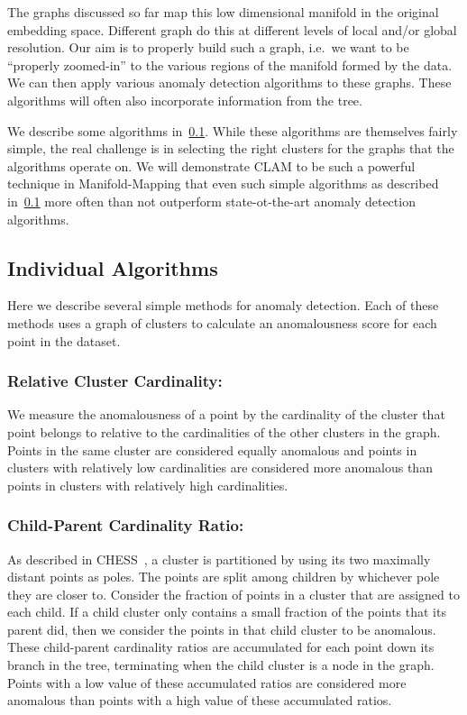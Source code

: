 The graphs discussed so far map this low dimensional manifold in the original embedding space.
Different graph do this at different levels of local and/or global resolution.
Our aim is to properly build such a graph, i.e.\ we want to be ``properly zoomed-in'' to the various regions of the manifold formed by the data.
We can then apply various anomaly detection algorithms to these graphs.
These algorithms will often also incorporate information from the tree.

We describe some algorithms in~\ref{subsec:chaoda:individual-algorithms}.
While these algorithms are themselves fairly simple, the real challenge is in selecting the right clusters for the graphs that the algorithms operate on.
We will demonstrate CLAM to be such a powerful technique in Manifold-Mapping that even such simple algorithms as described in~\ref{subsec:chaoda:individual-algorithms} more often than not outperform state-ot-the-art anomaly detection algorithms.

\subsection{Individual Algorithms}
\label{subsec:chaoda:individual-algorithms}

Here we describe several simple methods for anomaly detection.
Each of these methods uses a graph of clusters to calculate an anomalousness score for each point in the dataset.

\subsubsection{Relative Cluster Cardinality:}
We measure the anomalousness of a point by the cardinality of the cluster that point belongs to relative to the cardinalities of the other clusters in the graph.
Points in the same cluster are considered equally anomalous and points in clusters with relatively low cardinalities are considered more anomalous than points in clusters with relatively high cardinalities.

\subsubsection{Child-Parent Cardinality Ratio:}
As described in CHESS~\cite{ishaq2019entropy}, a cluster is partitioned by using its two maximally distant points as poles.
The points are split among children by whichever pole they are closer to.
Consider the fraction of points in a cluster that are assigned to each child.
If a child cluster only contains a small fraction of the points that its parent did, then we consider the points in that child cluster to be anomalous.
These child-parent cardinality ratios are accumulated for each point down its branch in the tree, terminating when the child cluster is a node in the graph.
Points with a low value of these accumulated ratios are considered more anomalous than points with a high value of these accumulated ratios.

